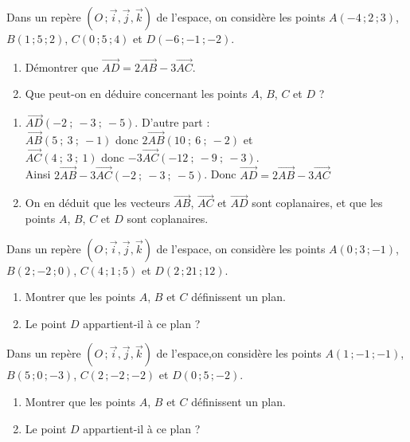 \documentclass{cornouaille}
\begin{document}
\begin{exercice}
  Dans un repère $(O\,;\vec{i},\vec{j},\vec{k})$ de l'espace, on
  considère les points $A(-4\,;2\,;3)$, $B(1\,;5\,;2)$, $C(0\,;5\,;4)$ et
  $D(-6\,;-1\,;-2)$.
  \begin{enumerate}
  \item Démontrer que
    $\overrightarrow{AD}=2\overrightarrow{AB}-3\overrightarrow{AC}$.
  \item Que peut-on en déduire concernant les points $A$, $B$, $C$ et
    $D$ ?
  \end{enumerate}
\end{exercice}
\begin{solution}
  \begin{enumerate}
\item $\overrightarrow{AD}(-2\ ;\ -3\ ;\ -5)$. D'autre part : \\ $\overrightarrow{AB}(5\ ;\ 3\ ;\ -1)$ donc $2\overrightarrow{AB}(10\ ;\ 6\ ;\ -2)$ et \\
$\overrightarrow{AC}(4\ ;\ 3\ ;\ 1)$ donc $-3\overrightarrow{AC}(-12\ ;\ -9\ ;\ -3)$.\\
Ainsi $2\overrightarrow{AB}-3\overrightarrow{AC}(-2\ ;\ -3\ ;\ -5)$.
Donc $\overrightarrow{AD}=2\overrightarrow{AB}-3\overrightarrow{AC}$
\item On en déduit que les vecteurs $\overrightarrow{AB}$, $\overrightarrow{AC}$ et $\overrightarrow{AD}$ sont coplanaires, et que les points $A$, $B$, $C$ et $D$ sont coplanaires.
 \end{enumerate}
\end{solution}

\begin{exercice}
  Dans un repère $(O\,;\vec{i},\vec{j},\vec{k})$ de l'espace, on
  considère les points $A(0\,;3\,;-1)$, $B(2\,;-2\,;0)$, $C(4\,;1\,;5)$ et
  $D(2\,;21\,;12)$.
  \begin{enumerate}
  \item Montrer que les points $A$, $B$ et $C$ définissent un plan.
  \item Le point $D$ appartient-il à ce plan ?
  \end{enumerate}
\end{exercice}

\begin{exercice}
  Dans un repère $(O\,;\vec{i},\vec{j},\vec{k})$ de l'espace,on
  considère les points $A(1\,;-1\,;-1)$, $B(5\,;0\,;-3)$, $C(2\,;-2\,;-2)$ et
  $D(0\,;5\,;-2)$.
  \begin{enumerate}
  \item Montrer que les points $A$, $B$ et $C$ définissent un plan.
  \item Le point $D$ appartient-il à ce plan ?
  \end{enumerate}
\end{exercice}
\end{document}
